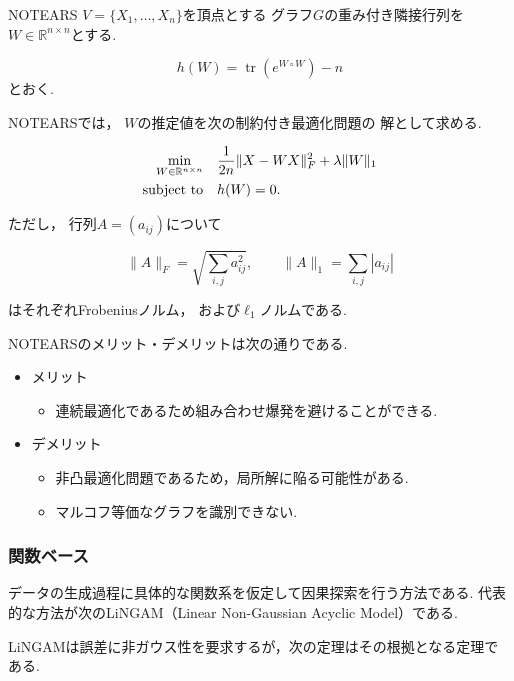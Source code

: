 \documentclass[uplatex, dvipdfmx]{jsarticle}
\begin{document}
\begin{defn}{NOTEARS}
  $V=\{X_1,\ldots,X_n\}$を頂点とする
  グラフ$G$の重み付き隣接行列を
  $W\in\mathbb{R}^{n\times n}$とする.

  \[
    h(W)
    =
    \operatorname{tr}
    \!\left(
      e^{W\circ W}
    \right)-n
  \]
  とおく.

  NOTEARSでは，
  $W$の推定値を次の制約付き最適化問題の
  解として求める.

  \begin{align}
    \min_{W\in\mathbb{R}^{n\times n}}
    \quad&
    \frac{1}{2n}
    \|X-WX\|_F^2
    +
    \lambda\|W\|_1 \notag\\
    \text{subject to}
    \quad&
    h(W)=0.
  \end{align}

  ただし，
  行列$A=(a_{ij})$について

  \[
    \|A\|_F
    =
    \sqrt{\sum_{i,j}a_{ij}^2},
    \qquad
    \|A\|_1
    =
    \sum_{i,j}|a_{ij}|
  \]

  はそれぞれFrobeniusノルム，
  および$\ell_1$ノルムである.
\end{defn}


NOTEARSのメリット・デメリットは次の通りである.
\begin{itemize}
  \item メリット
    \begin{itemize}
      \item 連続最適化であるため組み合わせ爆発を避けることができる.
   \end{itemize}

  \item デメリット
    \begin{itemize}
      \item 非凸最適化問題であるため，局所解に陥る可能性がある.
      \item マルコフ等価なグラフを識別できない.
    \end{itemize}
  \end{itemize}

\subsubsection*{関数ベース}

データの生成過程に具体的な関数系を仮定して因果探索を行う方法である.
代表的な方法が次のLiNGAM（Linear Non-Gaussian Acyclic Model）である.

LiNGAMは誤差に非ガウス性を要求するが，次の定理はその根拠となる定理である.
\end{document}
